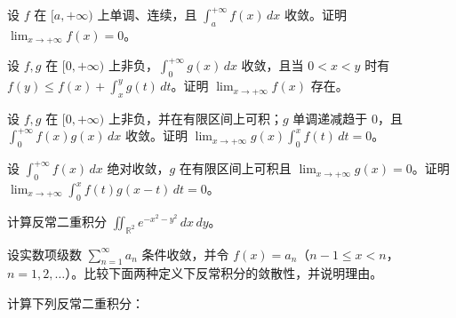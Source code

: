 \noindent\begin{minipage}{\textwidth}
设 $f$ 在 $[a,+\infty)$ 上单调、连续，且 $\displaystyle\int_a^{+\infty}f(x)\,dx$ 收敛。证明 $\displaystyle\lim_{x\to+\infty}f(x)=0$。
\end{minipage}\par\vfill
\noindent\begin{minipage}{\textwidth}
设 $f,g$ 在 $[0,+\infty)$ 上非负，$\displaystyle\int_0^{+\infty}g(x)\,dx$ 收敛，且当 $0<x<y$ 时有 $\displaystyle f(y)\le f(x)+\int_x^y g(t)\,dt$。证明 $\displaystyle\lim_{x\to+\infty}f(x)$ 存在。
\end{minipage}\par\vfill
\noindent\begin{minipage}{\textwidth}
设 $f,g$ 在 $[0,+\infty)$ 上非负，并在有限区间上可积；$g$ 单调递减趋于 $0$，且 $\displaystyle\int_0^{+\infty}f(x)g(x)\,dx$ 收敛。证明 $\displaystyle\lim_{x\to+\infty}g(x)\int_0^x f(t)\,dt=0$。
\end{minipage}\par\vfill
\newpage
\noindent\begin{minipage}{\textwidth}
设 $\displaystyle\int_0^{+\infty}f(x)\,dx$ 绝对收敛，$g$ 在有限区间上可积且 $\displaystyle\lim_{x\to+\infty}g(x)=0$。证明 $\displaystyle\lim_{x\to+\infty}\int_0^x f(t)g(x-t)\,dt=0$。
\end{minipage}\par\vfill
\noindent\begin{minipage}{\textwidth}
计算反常二重积分 $\displaystyle\iint_{\mathbb R^2}e^{-x^2-y^2}\,dx\,dy$。
\end{minipage}\par\vfill
\noindent\begin{minipage}{\textwidth}
设实数项级数 $\sum_{n=1}^{\infty}a_n$ 条件收敛，并令 $f(x)=a_n$（$n-1\le x<n$，$n=1,2,\ldots$）。比较下面两种定义下反常积分的敛散性，并说明理由。
\SubQ{2}{要求对任意有界 Jordan 可测集的递增列 $D_m\subset[0,+\infty)$，只要 $\bigcup_{m=1}^{\infty}D_m=[0,+\infty)$，积分 $\int_{D_m}f(x)\,dx$ 都趋向同一个有限极限。}
\end{minipage}\par\vfill
\noindent\begin{minipage}{\textwidth}
计算下列反常二重积分：
\end{minipage}\par\vfill
